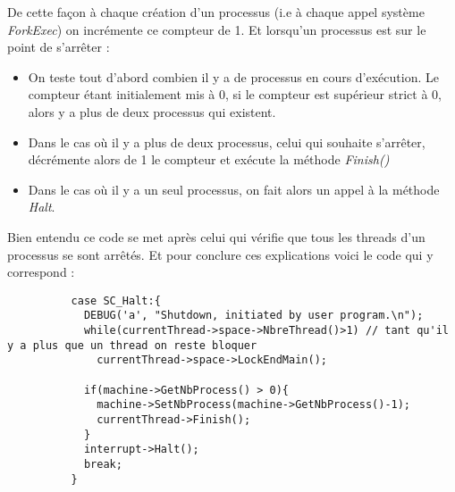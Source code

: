 \documentclass[a4paper,10pt]{report}
\begin{document}
  De cette façon à chaque création d'un processus (i.e à chaque appel système \emph{ForkExec}) on incrémente ce compteur de 1. Et lorsqu'un processus est 
  sur le point de s'arrêter : 
  \begin{itemize}
   \item On teste tout d'abord combien il y a de processus en cours d'exécution. Le compteur étant initialement mis à 0, si le compteur est supérieur 
   strict à 0, alors y a plus de deux processus qui existent.
   \item Dans le cas où il y a plus de deux processus, celui qui souhaite s'arrêter, décrémente alors de 1 le compteur et exécute la méthode \emph{Finish()}
   \item Dans le cas où il y a un seul processus, on fait alors un appel à la méthode \emph{Halt}.
  \end{itemize}
  Bien entendu ce code se met après celui qui vérifie que tous les threads d'un processus se sont arrêtés. Et pour conclure ces explications
  voici le code qui y correspond :
  \begin{lstlisting}
          case SC_Halt:{
            DEBUG('a', "Shutdown, initiated by user program.\n");
            while(currentThread->space->NbreThread()>1) // tant qu'il y a plus que un thread on reste bloquer
              currentThread->space->LockEndMain();
            
            if(machine->GetNbProcess() > 0){
              machine->SetNbProcess(machine->GetNbProcess()-1);
              currentThread->Finish();
            }
            interrupt->Halt();
            break;
          }   
  \end{lstlisting}
\end{document}
